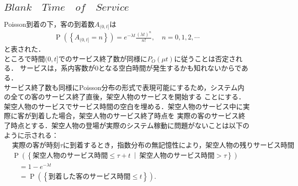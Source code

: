 \documentclass[a4j,papersize,disablejfam,slide,14pt]{jsarticle}
\def\exp#1{e^{#1}} %
\def\prob#1{\operatorname{P} \left(\left\{ #1 \right\}\right)} %
\def\cprob#1#2{\operatorname{P} \left(\left\{ #1 \ \middle|\ #2 \right\}\right)} %
\begin{document}
\subsection{$Blank\quad Time\quad of\quad Service$}
    {\rm Poisson}到着の下，客の到着数$A_{(0, t]}$は
    \begin{align}
    	\prob{A_{(0, t]} = n} = \exp{-\lambda t} \frac{(\lambda t)^n}{n!}, \quad n = 0, 1, 2, \cdots
    \end{align}
    と表された．\\
    ところで時間$(0, t]$でのサービス終了数が同様に$P_O(\mu t)$に従うことは否定される．
    サービスは，系内客数が$0$となる空白時間が発生するかも知れないからである．\\
    サービス終了数も同様に{\rm Poisson}分布の形式で表現可能にするため，システム内の全ての客のサービス終了直後，架空人物のサービスを開始する
    ことにする．架空人物のサービスでサービス時間の空白を埋める．架空人物のサービス中に実際に客が到着した場合，架空人物のサービス終了時点を
    実際の客のサービス終了時点とする．架空人物の登場が実際のシステム稼動に問題がないことは以下のように示される：
    \begin{align}
    	&\mbox{実際の客が時刻$\tau$に到着するとき，指数分布の無記憶性により，架空人物の残りサービス時間も同分布に従う．} \\
    	&\cprob{\mbox{架空人物のサービス時間} \leq \tau + t}{\mbox{架空人物のサービス時間} > \tau} \\
        &\quad= 1 - \exp{-\lambda t} \\
        &\quad= \prob{\mbox{到着した客のサービス時間} \leq t}.
    \end{align}
\end{document}
